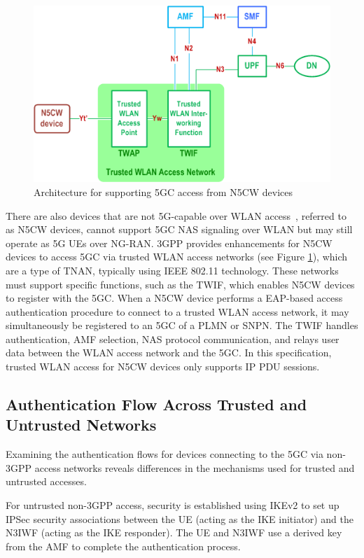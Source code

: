 \begin{figure}
    \centering
    \includegraphics[width=0.5\linewidth]{figs/Architecture for supporting 5GC access from N5CW devices.png}
    \caption{Architecture for supporting \acs{5GC} access from \acs{N5CW} devices}
    \label{fig:Architecture for supporting 5GC access from N5CW devices}
\end{figure}

There are also devices that are not \ac{5G}-capable over \ac{WLAN} access~\cite{23.501-p67}, referred to as \ac{N5CW} devices, cannot support \ac{5GC} \ac{NAS} signaling over \ac{WLAN} but may still operate as \ac{5G} \acp{UE} over \ac{NG-RAN}. \ac{3GPP} provides enhancements for N5CW devices to access \ac{5GC} via trusted \ac{WLAN} access networks (see Figure \ref{fig:Architecture for supporting 5GC access from N5CW devices}), which are a type of \ac{TNAN}, typically using IEEE 802.11 technology. These networks must support specific functions, such as the \ac{TWIF}, which enables \ac{N5CW} devices to register with the \ac{5GC}. When a \ac{N5CW} device performs a \ac{EAP}-based access authentication procedure to connect to a trusted \ac{WLAN} access network, it may simultaneously be registered to an \ac{5GC} of a \ac{PLMN} or \ac{SNPN}. The \ac{TWIF} handles authentication, \ac{AMF} selection, \ac{NAS} protocol communication, and relays user data between the \ac{WLAN} access network and the \ac{5GC}. In this specification, trusted \ac{WLAN} access for \ac{N5CW} devices only supports IP \ac{PDU} sessions.

\subsection{Authentication Flow Across Trusted and Untrusted Networks}

Examining the authentication flows for devices connecting to the \ac{5GC} via non-\ac{3GPP} access networks reveals differences in the mechanisms used for trusted and untrusted accesses.

For untrusted non-\ac{3GPP} access, security is established using \ac{IKEv2} to set up \ac{IPSec} security associations between the \ac{UE} (acting as the \ac{IKE} initiator) and the \ac{N3IWF} (acting as the \ac{IKE} responder). The \ac{UE} and \ac{N3IWF} use a derived key from the \ac{AMF} to complete the authentication process.

